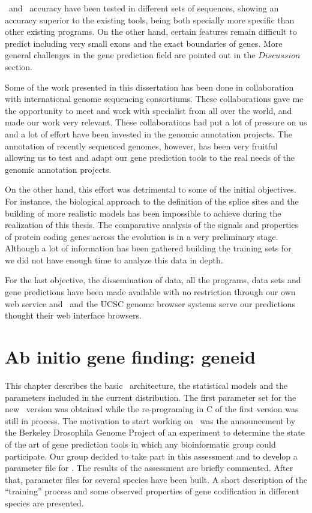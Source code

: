 \geneid\ and \sgp\ accuracy have been tested in different sets of
sequences, showing an accuracy superior to the existing tools, being
both specially more specific than other existing programs. On the
other hand, certain features remain difficult to predict including
very small exons and the exact boundaries of genes. More general
challenges in the gene prediction field are pointed out in the
$Discussion$ section.

Some of the work presented in this dissertation has been done in
collaboration with international genome sequencing consortiums. These
collaborations gave me the opportunity to meet and work with
specialist from all over the world, and made our work very
relevant. These collaborations had put a lot of pressure on us
and a lot of effort have been invested in the genomic annotation
projects. The annotation of recently sequenced genomes, however, has
been very fruitful allowing us to test and adapt our gene prediction
tools to the real needs of the genomic annotation projects.

On the other hand, this effort was detrimental to some of the initial
objectives. For instance, the biological approach to the definition of
the splice sites and the building of more realistic models has been
impossible to achieve during the realization of this thesis. The
comparative analysis of the signals and properties of protein coding
genes across the evolution is in a very preliminary stage. Although a
lot of information has been gathered building the training sets for
\geneid\, we did not have enough time to analyze this data in depth.

For the last objective, the dissemination of data, all the programs,
data sets and gene predictions have been made available with no
restriction through our own web service and \ensembl\ and the UCSC
genome browser systems serve our predictions thought their web
interface browsers.


\newpage


\chapter{Ab initio gene finding: geneid} 

This chapter describes the basic \geneid\ architecture, the
statistical models and the parameters included in the current
distribution. The first parameter set for the new \geneid\ version was
obtained while the re-programing in C of the first version was still
in process. The motivation to start working on \Dm\ was the
announcement by the Berkeley Drosophila Genome Project of an
experiment to determine the state of the art of gene prediction tools
in which any bioinformatic group could participate. Our group decided
to take part in this assessment and to develop a parameter file for
\DmL. The results of the assessment are briefly commented.  After
that, parameter files for several species have been built. A short
description of the ``training'' process and some observed properties
of gene codification in different species are presented.

